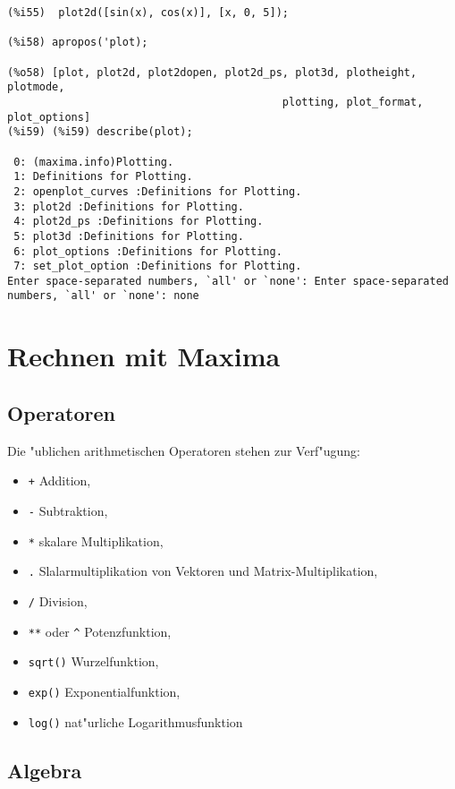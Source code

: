 \documentclass[ngerman,12pt,a4paper]{article}
\begin{document}
\scriptsize
\begin{verbatim}
(%i55)  plot2d([sin(x), cos(x)], [x, 0, 5]);

(%i58) apropos('plot);

(%o58) [plot, plot2d, plot2dopen, plot2d_ps, plot3d, plotheight, plotmode, 
                                           plotting, plot_format, plot_options]
(%i59) (%i59) describe(plot);

 0: (maxima.info)Plotting.
 1: Definitions for Plotting.
 2: openplot_curves :Definitions for Plotting.
 3: plot2d :Definitions for Plotting.
 4: plot2d_ps :Definitions for Plotting.
 5: plot3d :Definitions for Plotting.
 6: plot_options :Definitions for Plotting.
 7: set_plot_option :Definitions for Plotting.
Enter space-separated numbers, `all' or `none': Enter space-separated numbers, `all' or `none': none
\end{verbatim}
\normalsize


\section{Rechnen mit Maxima}


\subsection{Operatoren}

Die "ublichen arithmetischen Operatoren stehen zur Verf"ugung:

\begin{itemize}
\item \verb|+|  Addition,
\item \verb|-| Subtraktion,
\item \verb|*| skalare Multiplikation,
\item \verb|.| Slalarmultiplikation von Vektoren und Matrix-Multiplikation,
\item \verb|/| Division,
\item \verb|**| oder \verb|^| Potenzfunktion,
\item \verb|sqrt()| Wurzelfunktion,
\item \verb|exp()| Exponentialfunktion,
\item \verb|log()| nat"urliche Logarithmusfunktion
\end{itemize}


\subsection{Algebra}
\end{document}
